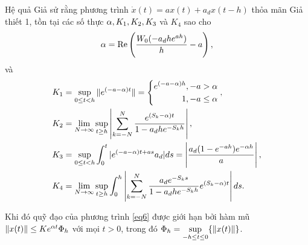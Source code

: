 \documentclass[10pt]{beamer}
\begin{document}
	
	\scriptsize{
	\begin{frame}
		\begin{block}{Hệ quả} Giả sử rằng phương trình $\dot{x}(t)=ax(t) + a_dx(t -h)$ thỏa mãn Giả thiết 1, tồn tại các số thực $\alpha, K_1, K_2, K_3$ và $K_4$ sao cho
			\begin{align*}
				\alpha = \mathrm{Re} \left( \dfrac{W_0(-a_dhe^{ah})}{h} - a\right),
			\end{align*}
			và
			\begin{align*}
				&K_1 = \sup \limits_{0 \le t <h} \Vert e^{(-a - \alpha)t} \Vert = \left\{\begin{aligned} e^{(-a-\alpha)h}, -a > \alpha\\1, -a \le \alpha\end{aligned}\right., \\
				&K_2 = \lim\limits_{N \to \infty}  \sup \limits_{t \ge h}\left| \sum_{k=-N}^N \dfrac{e^{(S_k-\alpha)t}}{1-a_dhe^{-S_kh}} \right|, \\
				&K_3 = \sup\limits_{0 \le t <h}\int_0^t | e^{(-a - \alpha)t + as }a_d | ds  = \left| \dfrac{a_d(1-e^{-ah})e^{-\alpha h}}{a}\right|, \\
				&K_4= \lim\limits_{N\to \infty} \sup\limits_{t \ge h} \int_0^h \left| \sum_{k=-N}^N \dfrac{a_de^{-S_ks }}{1-a_dhe^{-S_kh}}e^{(S_k-\alpha)t} \right| ds  .
			\end{align*}
			
			Khi đó quỹ đạo của phương trình \eqref{eq6} được giới hạn bởi hàm mũ $\Vert x(t) \Vert \le K e^{\alpha t} \Phi_h$ với mọi $t >0$, trong đó $\Phi_h = \sup \limits_{-h \le t \le 0}\{ \Vert x(t)\Vert\}$.
		\end{block}
	\end{frame}
		}
	
\end{document}
